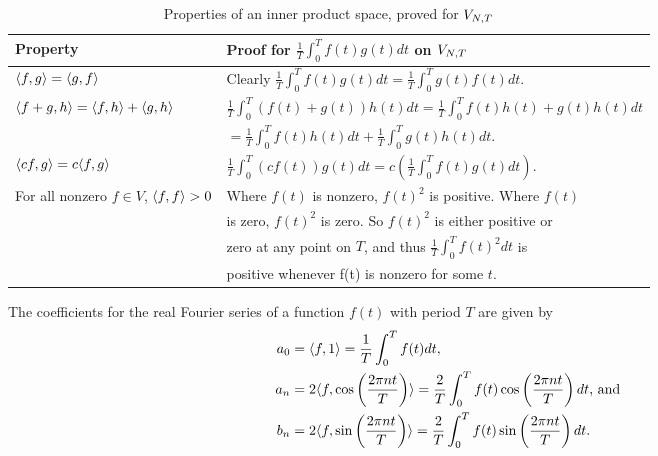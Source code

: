 \begin{table}[h]
\centering
    \begin{tabular}{|l|l|}
        \hline
        Property & Proof for $\frac{1}{T} \int_0^T f(t)g(t)dt$ on $V_{N,T}$\\ [1ex]
        \hline
        $\langle f,g \rangle = \langle g,f \rangle$ & Clearly $\frac{1}{T} \int_0^T f(t)g(t)dt = \frac{1}{T} \int_0^T g(t)f(t)dt$.\\ [1ex]
        \hline
        $\langle f+g,h \rangle = \langle f,h \rangle + \langle g,h \rangle$ & $\frac{1}{T} \int_0^T (f(t) + g(t))h(t)dt = \frac{1}{T} \int_0^T f(t)h(t) + g(t)h(t)dt$\\
        & $= \frac{1}{T} \int_0^T f(t)h(t)dt + \frac{1}{T} \int_0^T g(t)h(t)dt$.\\ [1ex]
        \hline
        $\langle cf,g \rangle = c\langle f,g \rangle$ & $\frac{1}{T} \int_0^T (cf(t))g(t)dt = c(\frac{1}{T} \int_0^T f(t)g(t)dt)$.\\ [1ex]
        \hline
        For all nonzero $f\in V$, $\langle f,f \rangle > 0$ & Where $f(t)$ is nonzero, $f(t)^2$ is positive. Where $f(t)$\\
        & is zero, $f(t)^2$ is zero. So $f(t)^2$ is either positive or\\
        & zero at any point on $T$, and thus $\frac{1}{T} \int_0^T {f(t)}^2dt$ is\\
        & positive whenever f(t) is nonzero for some $t$.\\ [1ex]
        \hline
    \end{tabular}
    \caption{Properties of an inner product space, proved for $V_{N,T}$}
    \label{tab:properties_inner_product}
\end{table}

\begin{definition}{The coefficients for the real Fourier series of a function $f(t)$ with period $T$ are given by}
    \begin{align*}
        \indent a_0 &= \innerprod{f}{1} = \frac{1}{T} \int_0^T f(t)dt,\\
        \indent a_n &= 2\innerprod{f}{\cos\left(\frac{2\pi nt}{T}\right)} = \frac{2}{T} \int_0^T f(t)\cos\left(\frac{2\pi nt}{T}\right)dt\text{, and}\\
        \indent b_n &= 2\innerprod{f}{\sin\left(\frac{2\pi nt}{T}\right)} = \frac{2}{T} \int_0^T f(t)\sin\left(\frac{2\pi nt}{T}\right)dt.  
    \end{align*}
    
    \label{real_F_coeffs}
\end{definition}


